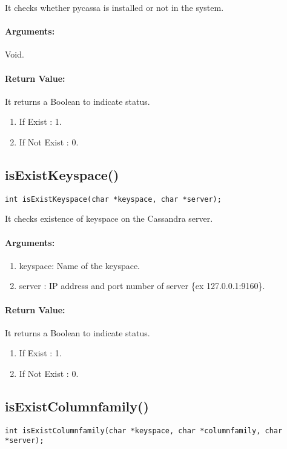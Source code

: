 \documentclass[12 pt , a4paper ]{report}
\begin{document}
  It checks whether pycassa is installed or not in the system.

  \paragraph{Arguments:} Void.

 \paragraph{Return Value:}
 It returns a Boolean to indicate status.
\begin{enumerate}
 \item If Exist : 1.
 \item If Not Exist   : 0.
\end{enumerate}


\subsection{isExistKeyspace()}
\begin{verbatim}
int isExistKeyspace(char *keyspace, char *server);
\end{verbatim}

  It checks existence of keyspace on the Cassandra server.

  \paragraph{Arguments:} 
	        \begin{enumerate}
		    \item keyspace: Name of the keyspace.
		    \item server : IP address and port number of server \{ex 127.0.0.1:9160\}.
		\end{enumerate}
		
 \paragraph{Return Value:}
 It returns a Boolean to indicate status.
\begin{enumerate}
 \item If Exist : 1.
 \item If Not Exist   : 0.
\end{enumerate}

\subsection{isExistColumnfamily()}
\begin{verbatim}
int isExistColumnfamily(char *keyspace, char *columnfamily, char *server);
\end{verbatim}
\end{document}
